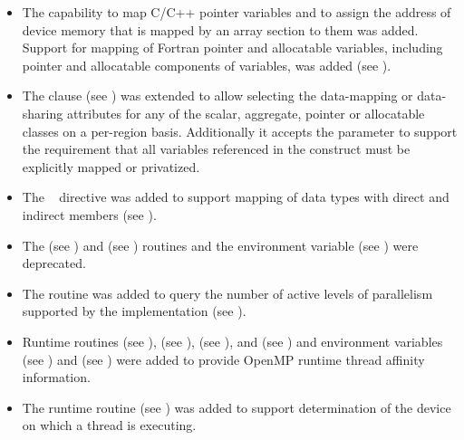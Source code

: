 \begin{itemize}
\item The capability to map C/C++ pointer variables and to assign the
      address of device memory that is mapped by an array section to them
      was added. Support for mapping of Fortran pointer and allocatable
      variables, including pointer and allocatable components of variables, 
      was added (see ).

\item The  clause (see )
      was extended to allow selecting the data-mapping or data-sharing attributes 
      for any of the scalar, aggregate, pointer or allocatable classes on a
      per-region basis. Additionally it accepts the  parameter to 
      support the requirement that all variables referenced in the construct 
      must be explicitly mapped or privatized.

\item The ~ directive was added to support
      mapping of data types with direct and indirect members (see
      ).

\item The  (see ) and
       (see ) routines and
      the  environment variable (see ) 
      were deprecated.

\item The  routine was added to query the
      number of active levels of parallelism supported by the
      implementation (see ).

\item Runtime routines 
      (see ), 
       (see ),
       (see ),
      and  (see ) 
      and environment variables  
      (see ) and  
      (see ) were added to provide OpenMP 
      runtime thread affinity information.

\item The  runtime routine
      (see ) was added to support
      determination of the device on which a thread is executing.


\end{itemize}
